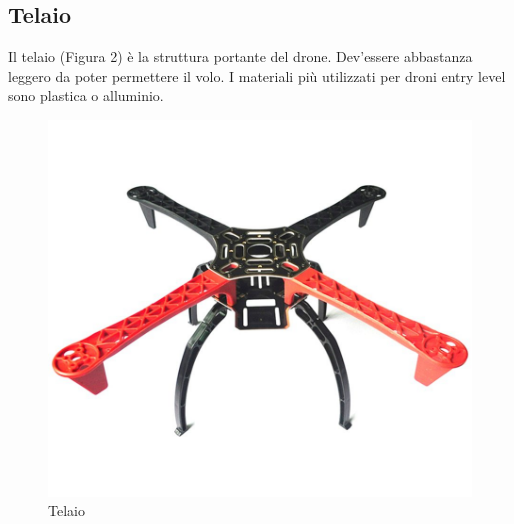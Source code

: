 \documentclass[]{article}
\begin{document}
\subsection{Telaio}
Il telaio (Figura 2) è la struttura portante del drone. Dev'essere abbastanza leggero da poter permettere il volo. I materiali più utilizzati per droni entry level sono plastica o alluminio.
\begin{figure}[!htpb]
\centering
\includegraphics[scale=0.7]{figura2.jpg}
\caption{Telaio}
\label{figura2}
\end{figure}
\end{document}
